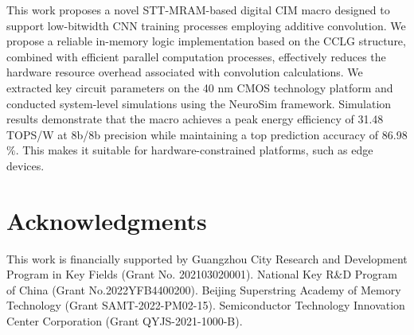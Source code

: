 \documentclass[submit]{elex2024}%
\begin{document}
This work proposes a novel STT-MRAM-based digital CIM macro designed to support low-bitwidth CNN training processes employing additive convolution. We propose a reliable in-memory logic implementation based on the CCLG structure, combined with efficient parallel computation processes, effectively reduces the hardware resource overhead associated with convolution calculations. We extracted key circuit parameters on the 40 nm CMOS technology platform and conducted system-level simulations using the NeuroSim framework. Simulation results demonstrate that the macro achieves a peak energy efficiency of 31.48 TOPS/W at 8b/8b precision while maintaining a top prediction accuracy of 86.98 $\%$. This makes it suitable for hardware-constrained platforms, such as edge devices.

\section*{Acknowledgments}

This work is financially supported by Guangzhou City Research and Development Program in Key Fields (Grant No. 202103020001). National Key R\&D Program of China (Grant No.2022YFB4400200). Beijing Superstring Academy of Memory Technology (Grant SAMT-2022-PM02-15). Semiconductor Technology Innovation Center Corporation (Grant QYJS-2021-1000-B).
\end{document}
